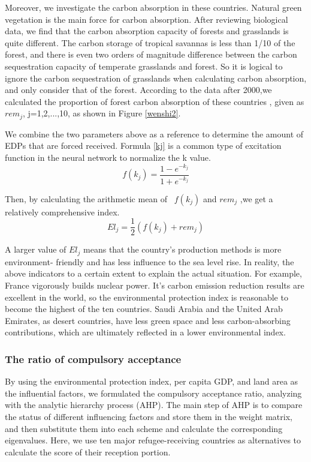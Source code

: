 \documentclass{mcmthesis}
\begin{document}
Moreover, we investigate the carbon absorption in these countries. Natural green vegetation is the main force for carbon absorption. After reviewing biological data, we find that the carbon absorption capacity of forests and grasslands is quite different. The carbon storage of tropical savannas is less than 1/10 of the forest, and there is even two orders of magnitude difference between the carbon sequestration capacity of temperate grasslands and forest. So it is logical to ignore the carbon sequestration of grasslands when calculating carbon absorption, and only consider that of the forest. According to the data after 2000,we calculated the proportion of forest carbon absorption of these countries , given as $ {rem}_{j} $, j=1,2,...,10, as shown in Figure \ref{wenshi2}.  	

We combine the two parameters above as a reference to determine the amount of EDPs that are forced received. Formula \eqref{kj} is a common type of excitation function in the neural network to normalize the k value.
\begin{equation}%
f(k_{j})=\dfrac{1-e^{-k_{j}}}{1+e^{-k_{j}}} \label{kj}
\end{equation}

Then, by calculating the arithmetic mean of \ $ f(k_{j}) $ and $ {rem}_{j} $ ,we get a relatively comprehensive index. 
\begin{equation}%
El_{j}=\frac{1}{2}(f(k_{j})+rem_{j})
\end{equation}

A larger value of $ {El}_{j} $ means that the country's production methods is more environment- friendly and has less influence to the sea level rise. In reality, the above indicators to a certain extent to explain the actual situation. For example, France vigorously builds nuclear power. It's carbon emission reduction results are excellent in the world, so the environmental protection index is reasonable to become the highest of the ten countries. Saudi Arabia and the United Arab Emirates, as desert countries, have less green space and less carbon-absorbing contributions, which are ultimately reflected in a lower environmental index. 

\subsubsection{The ratio of compulsory acceptance}

\quad\enspace By using the environmental protection index, per capita GDP, and land area as the influential factors, we formulated the compulsory acceptance ratio, analyzing with the analytic hierarchy process (AHP). The main step of AHP is to compare the status of different influencing factors and store them in the weight matrix, and then substitute them into each scheme and calculate the corresponding eigenvalues. Here, we use ten major refugee-receiving countries as alternatives to calculate the score of their reception portion.
\end{document}
